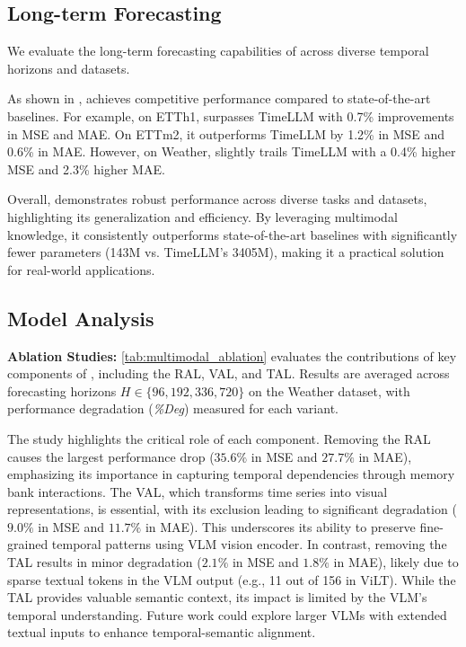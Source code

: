 \subsection{Long-term Forecasting}

We evaluate the long-term forecasting capabilities of \method across diverse temporal horizons and datasets.

As shown in , \method achieves competitive performance compared to state-of-the-art baselines. For example, on ETTh1, \method surpasses TimeLLM with 0.7\% improvements in MSE and MAE. On ETTm2, it outperforms TimeLLM by 1.2\% in MSE and 0.6\% in MAE. However, on Weather, \method slightly trails TimeLLM with a 0.4\% higher MSE and 2.3\% higher MAE.

Overall, \method demonstrates robust performance across diverse tasks and datasets, highlighting its generalization and efficiency. By leveraging multimodal knowledge, it consistently outperforms state-of-the-art baselines with significantly fewer parameters (143M vs. TimeLLM's 3405M), making it a practical solution for real-world applications.

\subsection{Model Analysis}

\noindent\textbf{Ablation Studies:} \autoref{tab:multimodal_ablation} evaluates the contributions of key components of \method, including the RAL, VAL, and TAL. Results are averaged across forecasting horizons $H \in \{96, 192, 336, 720\}$ on the Weather dataset, with performance degradation (\textit{\%Deg}) measured for each variant.

\vspace{-0.5em}


The study highlights the critical role of each component. Removing the RAL causes the largest performance drop (\(35.6\%\) in MSE and \(27.7\%\) in MAE), emphasizing its importance in capturing temporal dependencies through memory bank interactions. The VAL, which transforms time series into visual representations, is essential, with its exclusion leading to significant degradation (\(9.0\%\) in MSE and \(11.7\%\) in MAE). This underscores its ability to preserve fine-grained temporal patterns using VLM vision encoder. In contrast, removing the TAL results in minor degradation (\(2.1\%\) in MSE and \(1.8\%\) in MAE), likely due to sparse textual tokens in the VLM output (e.g., 11 out of 156 in ViLT). While the TAL provides valuable semantic context, its impact is limited by the VLM's temporal understanding. Future work could explore larger VLMs with extended textual inputs to enhance temporal-semantic alignment.

